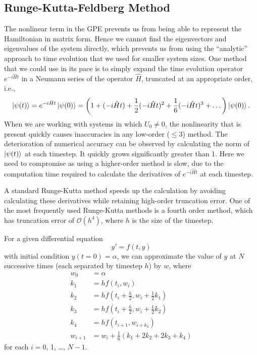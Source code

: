 \documentclass[a4paper, 10pt]{article}
\theoremstyle{plain}
\begin{document}
\subsection{Runge-Kutta-Feldberg Method}

The nonlinear term in the GPE prevents us from being able to represent the
Hamiltonian in matrix form. Hence we cannot find the eigenvectors and
eigenvalues of the system directly, which prevents us from using the ``analytic''
approach to time evolution that we used for smaller system sizes. One method
that we could use in its pace is to simply expand the time evolution operator
$e^{-i \hat{H} t}$ in a Neumann series of the operator $\hat{H}$, truncated at
an appropriate order, i.e.,
\begin{equation}
    \ket{\psi(t)}
    =
    e^{-i\hat{H}t}\ket{\psi(0)}
    =
    \left (
        1 + (-i \hat{H} t) + \frac{1}{2}(-i \hat{H} t)^{2} +
        \frac{1}{6}(-i \hat{H} t)^{3} + \dots
    \right)
    \ket{\psi(0)}.
\end{equation}
When we are working with systems in which $U_{0} \neq 0$, the nonlinearity that
is present quickly causes inaccuracies in any low-order ($\leq3$) method.
The deterioration of numerical accuracy can be observed by calculating the norm
of $\ket{\psi(t)}$ at each timestep. It quickly grows significantly greater than
1. Here we need to compromise as using a higher-order method is slow, due to the
computation time required to calculate the derivatives of $e^{-i\hat{H}t}$ at
each timestep.

A standard Runge-Kutta method speeds up the calculation by avoiding calculating
these derivatives while retaining high-order truncation error. One of the most
frequently used Runge-Kutta methods is a fourth order method, which has
truncation error of $\mathcal{O}(h^4)$, where $h$ is the size of the timestep.

For a given differential equation
\begin{equation}
    y' = f(t,y)
\end{equation}
with initial condition $y(t=0) = \alpha$, we can approximate the value of $y$ at
$N$ successive times (each separated by timestep $h$) by $w$, where
\begin{align*}
    w_{0}   &= \alpha
    \\
    k_{1}   &= hf(t_{i}, w_{i})
    \\
    k_{2}   &= hf \left( t_{i} + \frac{h}{2}, w_{i} + \frac{1}{2} k_{1} \right)
    \\
    k_{3}   &= hf \left( t_{i} + \frac{h}{2}, w_i+\frac{1}{2} k_{2} \right)
    \\
    k_{4}   &= hf (t_{i+1}, w_{i+k_{3}})
    \\
    w_{i+1} &= w_{i} + \frac{1}{6}(k_{1} + 2 k_{2} + 2 k_{3} + k_{4})
\end{align*}
for each $i = 0$, 1, \dots, $N-1$.
\end{document}
